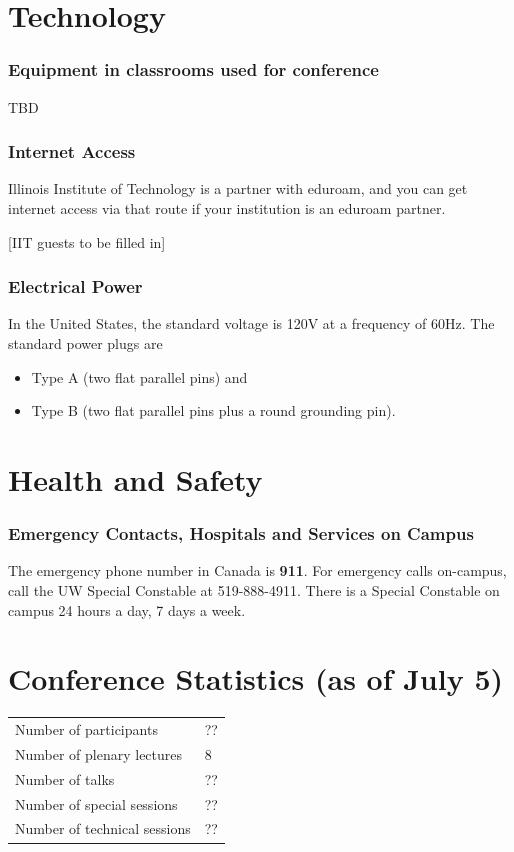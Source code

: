 

\section{Technology}

\subsubsection{Equipment in classrooms used for conference}

TBD


\subsubsection{Internet Access}

Illinois Institute of Technology is a partner with eduroam, and you can get internet access via that route if your institution is an eduroam partner.

[IIT guests to be filled in]

\subsubsection{Electrical Power}

In the United States, the standard voltage is 120V at a frequency of 60Hz.  The standard power plugs are 
\begin{itemize}
	\item Type A (two flat parallel pins) and 
	\item Type B (two flat parallel pins plus a round grounding pin).
\end{itemize}

\section{Health and Safety}


\subsubsection{Emergency Contacts, Hospitals and Services on Campus}

The emergency phone number in Canada is \textbf{911}. For emergency calls on-campus, call the UW Special Constable at 519-888-4911. There is a Special Constable on campus 24 hours a day, 7 days a week.



\section{Conference Statistics (as of July 5)}

\begin{center}
 \begin{tabular}{ll}
 Number of participants & ?? \\
 Number of plenary lectures & 8 \\
 Number of talks & ?? \\
 Number of special sessions & ?? \\
 Number of technical sessions & ?? \\
 \end{tabular}
\end{center}
